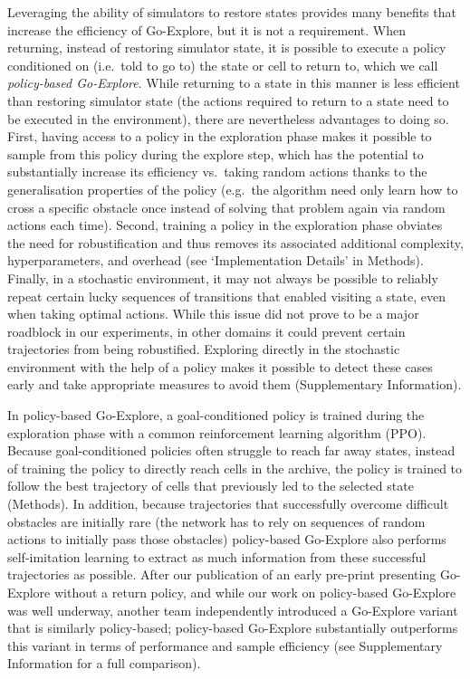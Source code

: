 \documentclass{nature}
\renewcommand*{\cite}[1]{\supercite{#1}}
\begin{document}
Leveraging the ability of simulators to restore states provides many benefits that increase the efficiency of Go-Explore, but it is not a requirement.
When returning, instead of restoring simulator state, it is possible to execute a policy conditioned on (i.e.\ told to go to) the state or cell to return to, which we call \emph{policy-based Go-Explore}. 
While returning to a state in this manner is less efficient than restoring simulator state 
(the actions required to return to a state need to be executed in the environment), there are nevertheless advantages to doing so.
First, having access to a policy in the exploration phase makes it possible to sample from this policy during the explore step, which has the potential to substantially increase its efficiency vs.\ taking random actions thanks to the generalisation properties of the policy (e.g.\ the algorithm need only learn how to cross a specific obstacle once instead of solving that problem again via random actions each time).
Second, training a policy in the exploration phase obviates the need for robustification and thus removes its associated additional complexity, hyperparameters, and overhead (see `Implementation Details' in Methods).
Finally, in a stochastic environment, it may not always be possible to reliably repeat certain lucky sequences of transitions that enabled visiting a state, even when taking optimal actions.
While this issue did not prove to be a major roadblock in our experiments, in other domains it could prevent certain trajectories from being robustified. 
Exploring directly in the stochastic environment with the help of a policy 
makes it possible to detect these cases early and take appropriate measures to avoid them (Supplementary Information).


In policy-based Go-Explore, a goal-conditioned policy is trained during the exploration phase with a common reinforcement learning algorithm (PPO\cite{Schulman2017ProximalPO}).
Because goal-conditioned policies often struggle to reach far away states\cite{eysenbach2019search}, instead of training the policy to directly reach cells in the archive, the policy is trained to follow the best trajectory of cells that previously led to the selected state (Methods).
In addition, because trajectories that successfully overcome difficult obstacles are initially rare (the network has to rely on sequences of random actions to initially pass those obstacles) policy-based Go-Explore also performs self-imitation learning to extract as much information from these successful trajectories as possible\cite{Oh2018SelfImitationL}.
After our publication of an early pre-print presenting Go-Explore without a return policy, and while our work on policy-based Go-Explore was well underway, another team independently introduced a Go-Explore variant that is similarly policy-based\cite{guo2019efficient}; policy-based Go-Explore substantially outperforms this variant in terms of performance and sample efficiency (see Supplementary Information for a full comparison).
\end{document}
